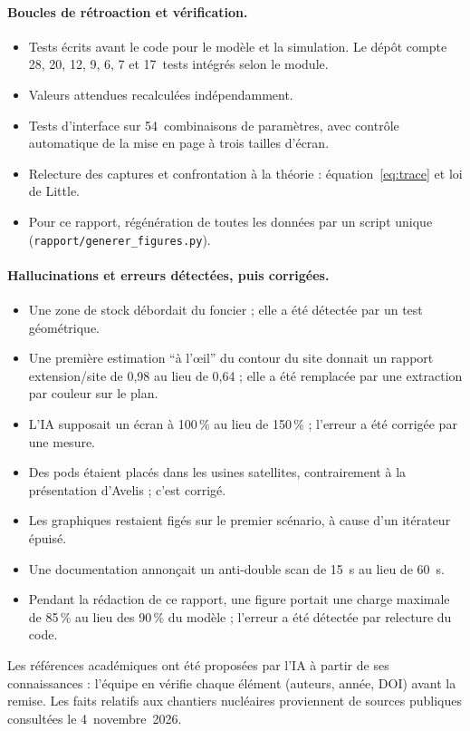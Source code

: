 \documentclass[11pt,a4paper]{article}
\newcommand{\code}[1]{\texttt{#1}}
\begin{document}
\paragraph{Boucles de rétroaction et vérification.}
\begin{itemize}
  \item Tests écrits avant le code pour le modèle et la simulation. Le dépôt compte 28, 20, 12,
        9, 6, 7 et 17~tests intégrés selon le module.
  \item Valeurs attendues recalculées indépendamment.
  \item Tests d'interface sur 54~combinaisons de paramètres, avec contrôle automatique de la mise
        en page à trois tailles d'écran.
  \item Relecture des captures et confrontation à la théorie : équation~\eqref{eq:trace} et loi
        de Little.
  \item Pour ce rapport, régénération de toutes les données par un script unique
        (\code{rapport/generer\_figures.py}).
\end{itemize}

\paragraph{Hallucinations et erreurs détectées, puis corrigées.}
\begin{itemize}
  \item Une zone de stock débordait du foncier ; elle a été détectée par un test géométrique.
  \item Une première estimation \enquote{à l'œil} du contour du site donnait un rapport
        extension/site de 0,98 au lieu de 0,64 ; elle a été remplacée par une extraction par
        couleur sur le plan.
  \item L'IA supposait un écran à 100\,\% au lieu de 150\,\% ; l'erreur a été corrigée par une
        mesure.
  \item Des pods étaient placés dans les usines satellites, contrairement à la présentation
        d'Avelis ; c'est corrigé.
  \item Les graphiques restaient figés sur le premier scénario, à cause d'un itérateur épuisé.
  \item Une documentation annonçait un anti-double scan de 15~s au lieu de 60~s.
  \item Pendant la rédaction de ce rapport, une figure portait une charge maximale de 85\,\%
        au lieu des 90\,\% du modèle ; l'erreur a été détectée par relecture du code.
\end{itemize}
Les références académiques ont été proposées par l'IA à partir de ses connaissances : l'équipe
en vérifie chaque élément (auteurs, année, DOI) avant la remise. Les faits relatifs aux chantiers
nucléaires proviennent de sources publiques consultées le 4~novembre~2026.
\end{document}

